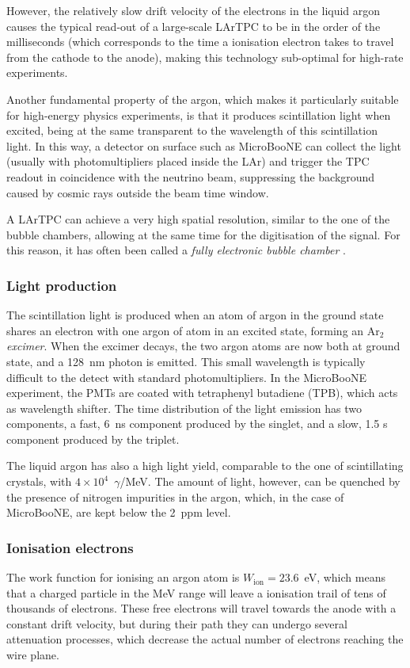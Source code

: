 However, the relatively slow drift velocity of the electrons in the liquid argon causes the typical read-out of a large-scale LArTPC to be in the order of the milliseconds (which corresponds to the time a ionisation electron takes to travel from the cathode to the anode), making this technology sub-optimal for high-rate experiments. 

Another fundamental property of the argon, which makes it particularly suitable for high-energy physics experiments, is that it produces scintillation light when excited, being at the same transparent to the wavelength of this scintillation light. In this way, a detector on surface such as MicroBooNE can collect the light (usually with photomultipliers placed inside the LAr) and trigger the TPC readout in coincidence with the neutrino beam, suppressing the background caused by cosmic rays outside the beam time window. 

A LArTPC can achieve a very high spatial resolution, similar to the one of the bubble chambers, allowing at the same time for the digitisation of the signal. For this reason, it has often been called a \emph{fully electronic bubble chamber} \cite{Rubbia:2011zza}. 

\subsubsection{Light production}
The scintillation light is produced when an atom of argon in the ground state shares an electron with one argon of atom in an excited state, forming an Ar$_{2}$ \emph{excimer}. When the excimer decays, the two argon atoms are now both at ground state, and a 128~nm photon is emitted. This small wavelength is typically difficult to the detect with standard photomultipliers. In the MicroBooNE experiment, the PMTs are coated with tetraphenyl butadiene (TPB), which acts as wavelength shifter. The time distribution of the light emission has two components, a fast, 6~ns component produced by the singlet, and a slow, 1.5 \si{\micro}s component produced by the triplet. 

The liquid argon has also a high light yield, comparable to the one of scintillating crystals, with $4\times10^4$~$\gamma$/MeV. The amount of light, however, can be quenched by the presence of nitrogen impurities in the argon, which, in the case of MicroBooNE, are kept below the 2~ppm level.

\subsubsection{Ionisation electrons}
The work function for ionising an argon atom is $W_{\mathrm{ion}} = 23.6$~eV, which means that a charged particle in the MeV range will leave a ionisation trail of tens of thousands of electrons. These free electrons will travel towards the anode with a constant drift velocity, but during their path they can undergo several attenuation processes, which decrease the actual number of electrons reaching the wire plane. 

